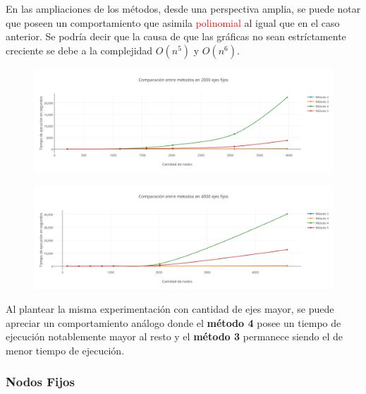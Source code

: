 En las ampliaciones de los m\'etodos, desde una perspectiva amplia, se puede notar que poseen un comportamiento que asimila \textcolor{red}{polinomial} al igual que en el caso anterior. Se podr\'ia decir que la causa de que las gr\'aficas no sean estr\'ictamente creciente se debe a la complejidad $O(n^5)$ y $O(n^6)$.

\newpage

   \begin{figure}[h!]
   \begin{center}
 	\includegraphics[scale=0.55]{imagenes/local/tiempos/2000ejes.png}
   \end{center}
 \end{figure}
 
  \begin{figure}[h!]
   \begin{center}
 	\includegraphics[scale=0.55]{imagenes/local/tiempos/4000ejes.png}
   \end{center}
 \end{figure}
  
Al plantear la misma experimentaci\'on con cantidad de ejes mayor, se puede apreciar un comportamiento an\'alogo donde el \textbf{m\'etodo 4} posee un tiempo de ejecuci\'on notablemente mayor al resto y el \textbf{m\'etodo 3} permanece siendo el de menor tiempo de ejecuci\'on.  
  
 \newpage  
  
\subsubsection*{Nodos Fijos}

